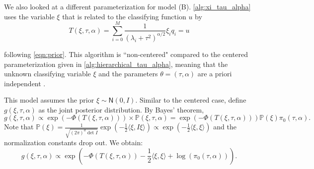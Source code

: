 \documentclass{siamart1116}
\begin{document}
        We also looked at a different parameterization for model (B). \cref{alg:xi_tau_alpha} uses the variable $\xi$ that is related to the classifying function $u$ by 
        \begin{equation}
        \label{eqn:noncentered_T}
        T(\xi,\tau,\alpha) = \sum_{i=0}^M \frac{1}{(\lambda_i+\tau^2)^{\alpha/2}}\xi_iq_i = u
        \end{equation}

        following \cref{eqn:prior}. This algorithm is ``non-centered" compared to the centered parameterization given in \cref{alg:hierarchical_tau_alpha}, meaning that the unknown classifying variable $\xi$ and the parameters $\theta=(\tau,\alpha)$ are a priori independent \cite{Noncentered}.

        This model assumes the prior $\xi \sim \mathsf{N}(0,I)$. Similar to the centered case, define $g(\xi,\tau,\alpha)$ as the joint posterior distribution. By Bayes' theorem, 
        \[g(\xi,\tau,\alpha) \propto \exp(-\Phi(T(\xi,\tau,\alpha)))\times \mathbb{P}(\xi,\tau,\alpha) = \exp(-\Phi(T(\xi,\tau,\alpha)))\mathbb{P}(\xi)\pi_0(\tau, \alpha).\]
        Note that $\mathbb{P}(\xi) = \frac{1}{\sqrt{(2\pi)^d \det I}} \exp(-\frac{1}{2}\langle \xi, I\xi  \rangle) \propto \exp(-\frac{1}{2}\langle \xi,\xi \rangle)$ and the normalization constants drop out. We obtain:
        \begin{equation}
        \label{eqn:noncentered_post}
        g(\xi,\tau,\alpha) \propto \exp\left( -\Phi(T(\xi,\tau,\alpha))-\frac{1}{2}\langle \xi,\xi \rangle + \log(\pi_0(\tau,\alpha)) \right).
        \end{equation}
\end{document}
